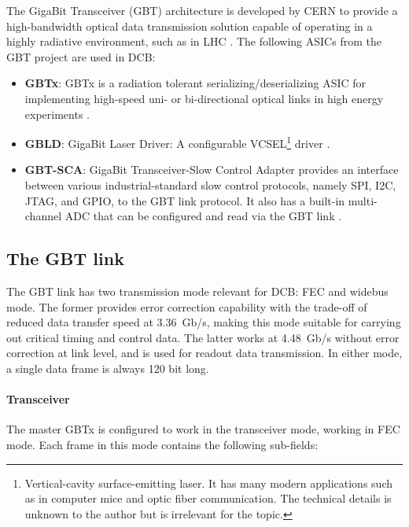 The GigaBit Transceiver (GBT) architecture is developed by CERN to provide a
high-bandwidth optical data transmission solution capable of operating in a
highly radiative environment, such as in LHC \cite{P_Moreira_2010}.
The following ASICs from the GBT project are used in DCB:

\begin{itemize}
    \item \textbf{GBTx}:
        GBTx is a radiation tolerant serializing/deserializing ASIC for
        implementing high-speed uni- or bi-directional optical links in high
        energy experiments
        \cite{gbtx_manual}.

    \item \textbf{GBLD}:
        GigaBit Laser Driver:
        A configurable VCSEL\footnote{
            Vertical-cavity surface-emitting laser.
            It has many modern applications such as in computer mice and optic
            fiber communication.
            The technical details is unknown to the author but is irrelevant
            for the topic.
        } driver
        \cite{gbld_manual}.

    \item \textbf{GBT-SCA}:
        GigaBit Transceiver-Slow Control Adapter provides an interface between
        various industrial-standard slow control protocols,
        namely SPI, I2C, JTAG, and GPIO, to the GBT link protocol.
        It also has a built-in multi-channel ADC that can be configured and
        read via the GBT link \cite{sca_manual}.
\end{itemize}


\subsection{The GBT link}

The GBT link has two transmission mode relevant for DCB: FEC and widebus mode.
The former provides error correction capability with the trade-off of reduced
data transfer speed at 3.36~Gb/s,
making this mode suitable for carrying out critical timing and control data.
The latter works at 4.48~Gb/s without error correction at link level,
and is used for readout data transmission.
In either mode, a single data frame is always 120 bit long.

\paragraph{Transceiver}
The master GBTx is configured to work in the transceiver mode, working in
FEC mode.
Each frame in this mode contains the following sub-fields:

